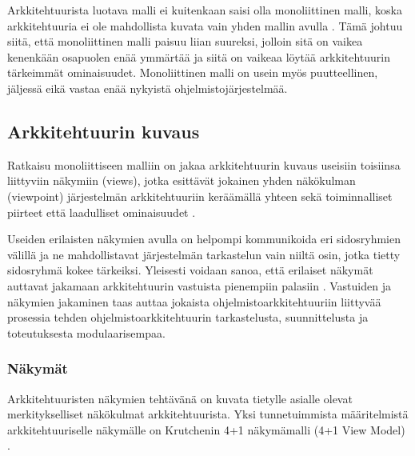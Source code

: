 \documentclass[finnish]{tktltiki2}
\numberwithin{table}{section}
\theoremstyle{definition}
\theoremstyle{remark}
\begin{document}
Arkkitehtuurista luotava malli ei kuitenkaan saisi olla monoliittinen malli, koska arkkitehtuuria ei ole mahdollista kuvata vain yhden mallin avulla \citep{Rozanski:2011:SSA:2072649}. Tämä johtuu siitä, että monoliittinen malli paisuu liian suureksi, jolloin sitä on vaikea kenenkään osapuolen enää ymmärtää ja siitä on vaikeaa löytää arkkitehtuurin tärkeimmät ominaisuudet. Monoliittinen malli on usein myös puutteellinen, jäljessä eikä vastaa enää nykyistä ohjelmistojärjestelmää.  


\subsection{Arkkitehtuurin kuvaus}

Ratkaisu monoliittiseen malliin on jakaa arkkitehtuurin kuvaus useisiin toisiinsa liittyviin näkymiin (views), jotka esittävät jokainen yhden näkökulman (viewpoint) järjestelmän arkkitehtuuriin keräämällä yhteen sekä toiminnalliset piirteet että laadulliset ominaisuudet \citetext{\citealp{Ran:1998:ASV:288408.288438}; \citealp[s. 33-34]{Rozanski:2011:SSA:2072649}; \citealp[s. 8-9]{gorton_understanding_2011}; }.

Useiden erilaisten näkymien avulla on helpompi kommunikoida eri sidosryhmien välillä ja ne mahdollistavat järjestelmän tarkastelun vain niiltä osin, jotka tietty sidosryhmä kokee tärkeiksi. Yleisesti voidaan sanoa, että erilaiset näkymät auttavat jakamaan arkkitehtuurin vastuista pienempiin palasiin \citep[s. 2]{Galster:2011:DTC:2031759.2031761}. Vastuiden ja näkymien jakaminen taas auttaa jokaista ohjelmistoarkkitehtuuriin liittyvää prosessia tehden ohjelmistoarkkitehtuurin tarkastelusta, suunnittelusta ja toteutuksesta modulaarisempaa.


\subsubsection{Näkymät}
Arkkitehtuuristen näkymien tehtävänä on kuvata tietylle asialle olevat merkitykselliset näkökulmat arkkitehtuurista. Yksi tunnetuimmista määritelmistä arkkitehtuuriselle näkymälle on Krutchenin 4+1 näkymämalli (4+1 View Model) \citep{krutchen1995}. 
\end{document}
